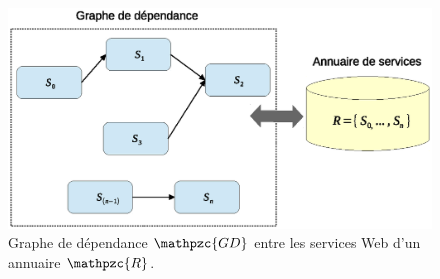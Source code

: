 \begin{figure}[h]
    \centering
    \includegraphics[width=1.1\textwidth]{figs/ch3/gd.eps}
    \caption{Graphe de dépendance $\mathpzc{GD}$ entre les services
      Web d'un annuaire $\mathpzc{R}$.}
    \label{fig:ch4/gd}
\end{figure}
